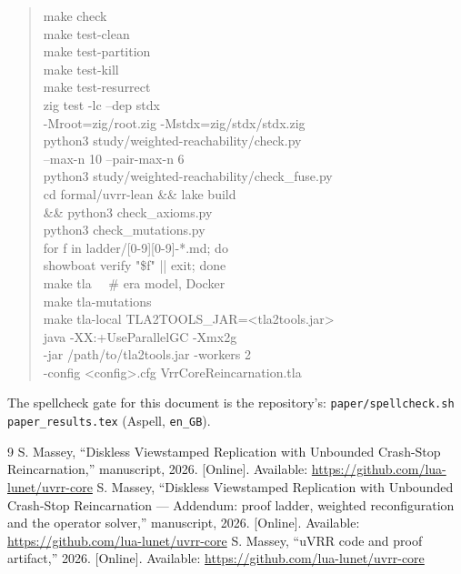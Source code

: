 \documentclass[10pt,journal,letterpaper]{IEEEtran}
\newcommand{\code}[1]{\texttt{#1}}
\begin{document}
\begin{quote}\raggedright\ttfamily\footnotesize
make check\\
make test-clean\\
make test-partition\\
make test-kill\\
make test-resurrect\\[4pt]
zig test -lc --dep stdx\\
\hspace*{2em}-Mroot=zig/root.zig -Mstdx=zig/stdx/stdx.zig\\[4pt]
python3 study/weighted-reachability/check.py\\
\hspace*{2em}--max-n 10 --pair-max-n 6\\
python3 study/weighted-reachability/check\_fuse.py\\[4pt]
cd formal/uvrr-lean \&\& lake build\\
\hspace*{2em}\&\& python3 check\_axioms.py\\
python3 check\_mutations.py\\
for f in ladder/[0-9][0-9]-*.md; do\\
\hspace*{2em}showboat verify "\$f" || exit; done\\[4pt]
make tla \ \ \# era model, Docker\\
make tla-mutations\\
make tla-local TLA2TOOLS\_JAR=<tla2tools.jar>\\
java -XX:+UseParallelGC -Xmx2g\\
\hspace*{2em}-jar /path/to/tla2tools.jar -workers 2\\
\hspace*{2em}-config <config>.cfg VrrCoreReincarnation.tla
\end{quote}

The spellcheck gate for this document is the repository's:
\code{paper/spellcheck.sh paper\_results.tex} (Aspell, \code{en\_GB}).

\begin{thebibliography}{9}
 S. Massey, ``Diskless Viewstamped Replication with Unbounded Crash-Stop Reincarnation,'' manuscript, 2026. [Online]. Available: \url{https://github.com/lua-lunet/uvrr-core}
 S. Massey, ``Diskless Viewstamped Replication with Unbounded Crash-Stop Reincarnation --- Addendum: proof ladder, weighted reconfiguration and the operator solver,'' manuscript, 2026. [Online]. Available: \url{https://github.com/lua-lunet/uvrr-core}
 S. Massey, ``uVRR code and proof artifact,'' 2026. [Online]. Available: \url{https://github.com/lua-lunet/uvrr-core}
\end{thebibliography}
\end{document}
